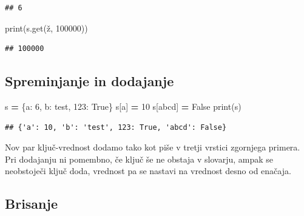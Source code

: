 \documentclass[
]{report}
\newenvironment{Shaded}{\begin{snugshade}}{\end{snugshade}}
\newcommand{\BuiltInTok}[1]{#1}
\newcommand{\DecValTok}[1]{\textcolor[rgb]{0.00,0.00,0.81}{#1}}
\newcommand{\NormalTok}[1]{#1}
\newcommand{\OperatorTok}[1]{\textcolor[rgb]{0.81,0.36,0.00}{\textbf{#1}}}
\newcommand{\StringTok}[1]{\textcolor[rgb]{0.31,0.60,0.02}{#1}}
\newcommand{\VariableTok}[1]{\textcolor[rgb]{0.00,0.00,0.00}{#1}}
\begin{document}
\begin{verbatim}
## 6
\end{verbatim}

\begin{Shaded}
\begin{Highlighting}[]
\BuiltInTok{print}\NormalTok{(s.get(}\StringTok{\textquotesingle{}ž\textquotesingle{}}\NormalTok{, }\DecValTok{100000}\NormalTok{))}
\end{Highlighting}
\end{Shaded}

\begin{verbatim}
## 100000
\end{verbatim}

\hypertarget{spreminjanje-in-dodajanje}{%
\subsection{Spreminjanje in dodajanje}\label{spreminjanje-in-dodajanje}}

\begin{Shaded}
\begin{Highlighting}[]
\NormalTok{s }\OperatorTok{=}\NormalTok{ \{}\StringTok{\textquotesingle{}a\textquotesingle{}}\NormalTok{: }\DecValTok{6}\NormalTok{, }\StringTok{\textquotesingle{}b\textquotesingle{}}\NormalTok{: }\StringTok{\textquotesingle{}test\textquotesingle{}}\NormalTok{, }\DecValTok{123}\NormalTok{: }\VariableTok{True}\NormalTok{\}}
\NormalTok{s[}\StringTok{\textquotesingle{}a\textquotesingle{}}\NormalTok{] }\OperatorTok{=} \DecValTok{10}
\NormalTok{s[}\StringTok{\textquotesingle{}abcd\textquotesingle{}}\NormalTok{] }\OperatorTok{=} \VariableTok{False}
\BuiltInTok{print}\NormalTok{(s)}
\end{Highlighting}
\end{Shaded}

\begin{verbatim}
## {'a': 10, 'b': 'test', 123: True, 'abcd': False}
\end{verbatim}

Nov par ključ-vrednost dodamo tako kot piše v tretji vrstici zgornjega primera. Pri dodajanju ni pomembno, če ključ še ne obstaja v slovarju, ampak se neobstoječi ključ doda, vrednost pa se nastavi na vrednost desno od enačaja.

\hypertarget{brisanje}{%
\subsection{Brisanje}\label{brisanje}}
\end{document}
